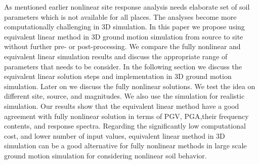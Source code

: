 As mentioned earlier nonlinear site response analysis needs elaborate set of soil parameters which is not available for all places. The analyses become more computationally challenging in 3D simulation. In this paper we propose using equivalent linear method in 3D ground motion simulation from source to site without further pre- or post-processing. We compare the fully nonlinear and equivalent linear simulation results and discuss the appropriate range of parameters that needs to be consider. In the following section we discuss the equivalent linear solution steps and implementation in 3D ground motion simulation. Later on we discuss the fully nonlinear solutions. We test the idea on different site, source, and magnitudes. We also use the simulation for realistic simulation. Our results show that the equivalent linear method have a good agreement with fully nonlinear solution in terms of PGV, PGA,their frequency contents, and response spectra. Regarding the significantly low computational cost, and lower number of input values, equivalent linear method in 3D simulation can be a good alternative for fully nonlinear methods in large scale ground motion simulation for considering nonlinear soil behavior. 







